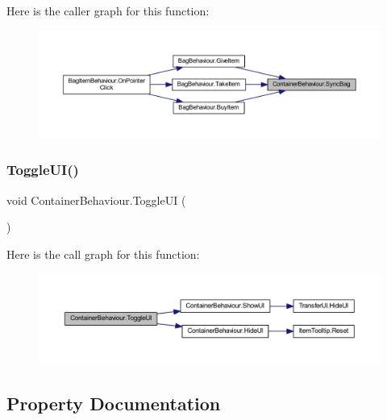 Here is the caller graph for this function\+:
\nopagebreak
\begin{figure}[H]
\begin{center}
\leavevmode
\includegraphics[width=350pt]{class_container_behaviour_aea3c37f67bc244516f307f2c59a27b8f_icgraph}
\end{center}
\end{figure}
\mbox{\label{class_container_behaviour_a12b621fb47599b10bec679acb4cbe24e}} 
\subsubsection{\texorpdfstring{ToggleUI()}{ToggleUI()}}
{\footnotesize\ttfamily void Container\+Behaviour.\+Toggle\+UI (\begin{DoxyParamCaption}{ }\end{DoxyParamCaption})}

Here is the call graph for this function\+:
\nopagebreak
\begin{figure}[H]
\begin{center}
\leavevmode
\includegraphics[width=350pt]{class_container_behaviour_a12b621fb47599b10bec679acb4cbe24e_cgraph}
\end{center}
\end{figure}


\subsection{Property Documentation}
\mbox{\label{class_container_behaviour_ab0e91f3cfb15de3442dbef4ac2885c21}} 
